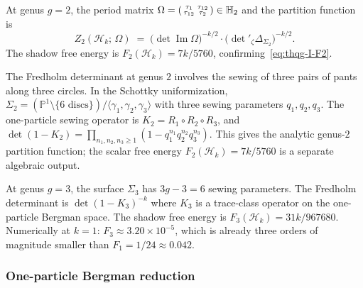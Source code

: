\begin{example}
\label{ex:thqg-I-genus2}
At genus $g = 2$, the period matrix $\Omega = \begin{psmallmatrix} \tau_1 & \tau_{12} \\ \tau_{12} & \tau_2 \end{psmallmatrix} \in \mathbb{H}_2$ and the partition function is
\begin{equation}\label{eq:thqg-I-genus2}
Z_2(\mathcal{H}_k;\,\Omega) \;=\; \bigl(\det\operatorname{Im}\Omega\bigr)^{-k/2} \cdot \bigl(\det{}'_\zeta \Delta_{\Sigma_2}\bigr)^{-k/2}.
\end{equation}
The shadow free energy is $F_2(\mathcal{H}_k) = 7k/5760$, confirming~\eqref{eq:thqg-I-F2}.

The Fredholm determinant at genus $2$ involves the sewing of three
pairs of pants along three circles. In the Schottky uniformization,
$\Sigma_2 = (\mathbb{P}^1 \setminus \{6 \text{ discs}\}) /
\langle \gamma_1, \gamma_2, \gamma_3 \rangle$ with three sewing
parameters $q_1, q_2, q_3$. The one-particle sewing operator is
$K_2 = R_1 \circ R_2 \circ R_3$, and
$\det(1 - K_2) = \prod_{n_1,n_2,n_3 \geq 1}
(1 - q_1^{n_1} q_2^{n_2} q_3^{n_3})$. This gives the analytic
genus-$2$ partition function; the scalar free energy
$F_2(\mathcal{H}_k)=7k/5760$ is a separate algebraic output.
\end{example}

\begin{example}[Genus $3$]
\label{ex:thqg-I-genus3-heisenberg}
At genus $g = 3$, the surface $\Sigma_3$ has $3g - 3 = 6$ sewing parameters. The Fredholm determinant is $\det(1 - K_3)^{-k}$ where $K_3$ is a trace-class operator on the one-particle Bergman space. The shadow free energy is $F_3(\mathcal{H}_k) = 31k/967680$. Numerically at $k = 1$: $F_3 \approx 3.20 \times 10^{-5}$, which is already three orders of magnitude smaller than $F_1 = 1/24 \approx 0.042$.
\end{example}

\subsubsection{One-particle Bergman reduction}


